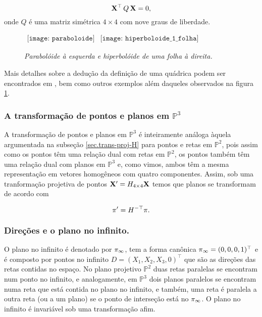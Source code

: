 \begin{equation*}
\mathbf{X}^\top\,Q\,\mathbf{X} = 0,
\end{equation*}
onde $Q$ é uma matriz simétrica $4\times4$ com nove graus de liberdade.

\begin{figure}[!htb]
\qquad\qquad
$
\begin{array}{cc}
\texttt{[image: paraboloide]}
&
\texttt{[image: hiperboloide\_1\_folha]}
\end{array}
$
\caption{\textit{Parabolóide à esquerda e hiperbolóide de uma folha à direita.}}
\label{quadricas}
\end{figure}


Mais detalhes sobre a dedução da definição de uma quádrica podem ser encontrados em \cite{Hartley2004}, bem como outros exemplos além daqueles observados na figura \ref{quadricas}.\\

\subsubsection{A transformação de pontos e planos em $\mathbb{P}^3$}\label{sec.trans-pontos-planos-P3}

A transformação de pontos e planos em $\mathbb{P}^3$ é inteiramente análoga àquela argumentada na subseção \ref{sec.trans-proj-H} para pontos e retas em $\mathbb{P}^2$, pois assim como os pontos têm uma relação dual com retas em $\mathbb{P}^2$, os pontos também têm uma relação dual com planos em $\mathbb{P}^3$ e, como vimos, ambos têm a mesma representação em vetores homogêneos com quatro componentes. Assim, sob uma tranformação projetiva de pontos $\mathbf{X}'=H_{4\times4}\mathbf{X}$ temos que planos se transformam de acordo com

\begin{equation*}
\pi'=H^{-\top}\pi.
\end{equation*}







\subsubsection{Direções e o plano no infinito.}\label{sec.direcoes-plano-infinito}

O plano no infinito é denotado por $\pi_\infty$, tem a forma canônica $\pi_\infty=(0,0,0,1)^\top$ e é composto por pontos no infinito $D=(X_1,X_2,X_3,0)^\top$ que são as direções das retas contidas no espaço. No plano projetivo $\mathbb{P}^2$ duas retas paralelas se encontram num ponto no infinito, e analogamente, em  $\mathbb{P}^3$ dois planos paralelos se encontram numa reta que está contida no plano no infinito, e também, uma reta é paralela a outra reta (ou a um plano) se o ponto de interseção está no $\pi_\infty$. O plano no infinito é invariável sob uma transformação afim.

